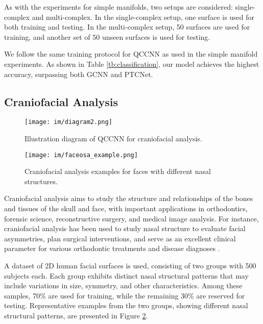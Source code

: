 As with the experiments for simple manifolds, two setups are considered: single-complex and multi-complex. In the single-complex setup, one surface is used for both training and testing. In the multi-complex setup, 50 surfaces are used for training, and another set of 50 unseen surfaces is used for testing.

We follow the same training protocol for QCCNN as used in the simple manifold experiments. As shown in Table \ref{tb:classification}, our model achieves the highest accuracy, surpassing both GCNN and PTCNet.


\subsection{Craniofacial Analysis}




\begin{figure}
    \centering
    \texttt{[image: im/diagram2.png]}
    \caption{Illustration diagram of QCCNN for craniofacial analysis.}
    \label{fig:diagram2}
\end{figure}

\begin{figure}
    \centering
    \texttt{[image: im/faceosa\_example.png]}
    \caption{Craniofacial analysis examples for faces with different nasal structures.}
    \label{fig:faceosa}
\end{figure}
Craniofacial analysis aims to study the structure and relationships of the bones and tissues of the skull and face, with important applications in orthodontics, forensic science, reconstructive surgery, and medical image analysis. For instance, craniofacial analysis has been used to study nasal structure to evaluate facial asymmetries, plan surgical interventions, and serve as an excellent clinical parameter for various orthodontic treatments \cite{nehra2009nasal,burstone1958integumental} and disease diagnoses \cite{matthews2022static}.

A dataset of 2D human facial surfaces is used, consisting of two groups with 500 subjects each. Each group exhibits distinct nasal structural patterns that may include variations in size, symmetry, and other characteristics. Among these samples, 70\% are used for training, while the remaining 30\% are reserved for testing. Representative examples from the two groups, showing different nasal structural patterns, are presented in Figure \ref{fig:faceosa}.



